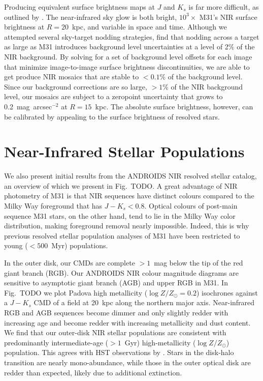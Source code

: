 \documentclass[11pt,twoside]{article}
\begin{document}
Producing equivalent surface brightness maps at $J$ and $K_s$ is far more difficult, as outlined by \cite{Sick:2013}.
The near-infrared sky glow is both bright, $10^3\times$ M31's NIR surface brightness at $R=20$~kpc, and variable in space and time.
Although we attempted several sky-target nodding strategies, \cite{Sick:2013} find that nodding across a target as large as M31 introduces background level uncertainties at a level of 2\% of the NIR background.
By solving for a set of background level offsets for each image that minimize image-to-image surface brightness discontinuities, we are able to get produce NIR mosaics that are stable to $< 0.1$\% of the background level.
Since our background corrections are so large, $>1$\% of the NIR background level, our mosaics are subject to a zeropoint uncertainty that grows to 0.2~mag~arcsec$^{-2}$ at $R=15$~kpc.
The absolute surface brightness, however, can be calibrated by appealing to the surface brightness of resolved stars.

\section{Near-Infrared Stellar Populations}

We also present initial results from the ANDROIDS NIR resolved stellar catalog, an overview of which we present in Fig.~TODO.
A great advantage of NIR photometry of M31 is that NIR sequences have distinct colours compared to the Milky Way foreground that has $J-K_s < 0.8$.
Optical colours of post-main sequence M31 stars, on the other hand, tend to lie in the Milky Way color distribution, making foreground removal nearly impossible.
Indeed, this is why previous resolved stellar population analyses of M31 \citep[e.g.,][]{Williams:2003,Davidge:2012} have been restricted to young ($<500$~Myr) populations.

In the outer disk, our CMDs are complete $>1$~mag below the tip of the red giant branch (RGB).
Our ANDROIDS NIR colour magnitude diagrams are sensitive to asymptotic giant branch (AGB) and upper RGB in M31.
In Fig.~TODO we plot Padova high metallicity ($\log Z/Z_\odot = 0.2$) isochrones \citep{Marigo:2008} against a $J-K_s$ CMD of a field at 20~kpc along the northern major axis.
Near-infrared RGB and AGB sequences become dimmer and only slightly redder with increasing age and become redder with increasing metallicity and dust content.
We find that our outer-disk NIR stellar populations are consistent with predominantly intermediate-age ($>1$~Gyr) high-metallicity ($\log Z/Z_\odot$) population.
This agrees with HST observations by \cite{Brown:2006}.
Stars in the disk-halo transition are nearly mono-abundance, while those in the outer optical disk are redder than expected, likely due to additional extinction.
\end{document}
